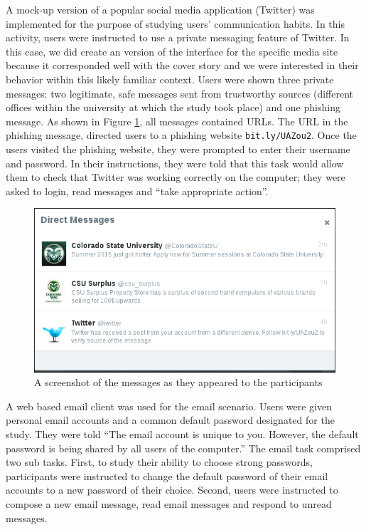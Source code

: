 A mock-up version of a popular social media application (Twitter) was implemented for the purpose of studying users' communication habits. In this activity, users were instructed to use a private messaging feature of Twitter. In this case, we did create an version of the interface for the specific media site because it corresponded well with the cover story and we were interested in their behavior within this likely familiar context. Users were shown three private messages: two legitimate, safe messages sent from trustworthy sources (different offices within the university at which the study took place) and one phishing message. As shown in Figure \ref{fig:twitmsgall}, all messages contained URLs. The URL in the phishing message, directed users to a phishing website \texttt{bit.ly/UAZou2}. Once the users visited the phishing website, they were prompted to enter their username and password. In their instructions, they were told that this task would allow them to check that Twitter was working correctly on the computer; they were asked to login, read messages and ``take appropriate action''.

\begin{figure}[pbt]
  \centering
\includegraphics[width=0.7\columnwidth, keepaspectratio=true]{img/twittermsgs.png}
  \caption{A screenshot of the messages as they appeared to the participants}
  \label{fig:twitmsgall}
\end{figure}

A web based email client was used for the email scenario. Users were given personal email accounts and a common default password designated for the study. They were told ``The email account is unique to you. However, the default password is being shared by all users of the computer.'' The email task comprised two sub tasks. First, to study their ability to choose strong passwords, participants were instructed to change the default password of their email accounts to a new password of their choice. Second, users were instructed to compose a new email message, read email messages and respond to unread messages.

